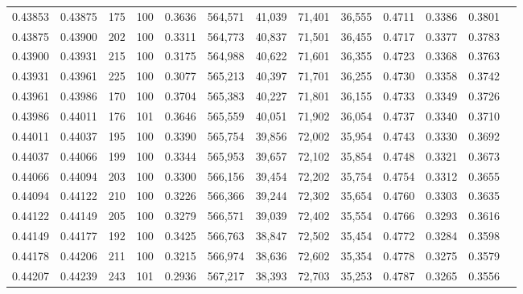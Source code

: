 \begin{tabular}{rrrrrrrrrrrrr}
0.43853 & 0.43875 &    175 & 100 &                                     0.3636 & 564,571 &  41,039 &  71,401 &  36,555 & 0.4711 & 0.3386 & 0.3801 \\
0.43875 & 0.43900 &    202 & 100 &                                     0.3311 & 564,773 &  40,837 &  71,501 &  36,455 & 0.4717 & 0.3377 & 0.3783 \\
0.43900 & 0.43931 &    215 & 100 &                                     0.3175 & 564,988 &  40,622 &  71,601 &  36,355 & 0.4723 & 0.3368 & 0.3763 \\
0.43931 & 0.43961 &    225 & 100 &                                     0.3077 & 565,213 &  40,397 &  71,701 &  36,255 & 0.4730 & 0.3358 & 0.3742 \\
0.43961 & 0.43986 &    170 & 100 &                                     0.3704 & 565,383 &  40,227 &  71,801 &  36,155 & 0.4733 & 0.3349 & 0.3726 \\
0.43986 & 0.44011 &    176 & 101 &                                     0.3646 & 565,559 &  40,051 &  71,902 &  36,054 & 0.4737 & 0.3340 & 0.3710 \\
0.44011 & 0.44037 &    195 & 100 &                                     0.3390 & 565,754 &  39,856 &  72,002 &  35,954 & 0.4743 & 0.3330 & 0.3692 \\
0.44037 & 0.44066 &    199 & 100 &                                     0.3344 & 565,953 &  39,657 &  72,102 &  35,854 & 0.4748 & 0.3321 & 0.3673 \\
0.44066 & 0.44094 &    203 & 100 &                                     0.3300 & 566,156 &  39,454 &  72,202 &  35,754 & 0.4754 & 0.3312 & 0.3655 \\
0.44094 & 0.44122 &    210 & 100 &                                     0.3226 & 566,366 &  39,244 &  72,302 &  35,654 & 0.4760 & 0.3303 & 0.3635 \\
0.44122 & 0.44149 &    205 & 100 &                                     0.3279 & 566,571 &  39,039 &  72,402 &  35,554 & 0.4766 & 0.3293 & 0.3616 \\
0.44149 & 0.44177 &    192 & 100 &                                     0.3425 & 566,763 &  38,847 &  72,502 &  35,454 & 0.4772 & 0.3284 & 0.3598 \\
0.44178 & 0.44206 &    211 & 100 &                                     0.3215 & 566,974 &  38,636 &  72,602 &  35,354 & 0.4778 & 0.3275 & 0.3579 \\
0.44207 & 0.44239 &    243 & 101 &                                     0.2936 & 567,217 &  38,393 &  72,703 &  35,253 & 0.4787 & 0.3265 & 0.3556 \\

\end{tabular}

